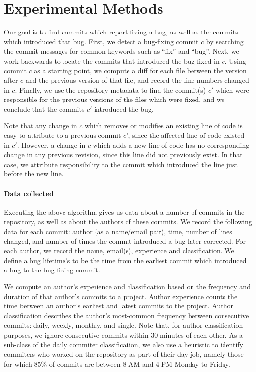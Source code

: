 \section{Experimental Methods}
\label{sec:method}
Our goal is to find commits which report fixing a bug, as well as the commits
which introduced that bug. First, we detect a bug-fixing commit $c$ by
searching the commit messages for common keywords such as ``fix'' and
``bug''. Next, we work backwards to locate the commits that introduced
the bug fixed in $c$. Using commit $c$ as a starting point, we compute
a diff for each file between the version after $c$ and the previous
version of that file, and record the line numbers changed in
$c$. Finally, we use the repository metadata to find the commit(s)
$c'$ which were responsible for the previous versions of the files
which were fixed, and we conclude that the commits $c'$ introduced the
bug.

Note that any change in $c$ which removes or modifies an existing line
of code is easy to attribute to a previous commit $c'$, since the
affected line of code existed in $c'$. However, a change in $c$ which
adds a new line of code has no corresponding change in any previous
revision, since this line did not previously exist. In that case, we
attribute responsibility to the commit which introduced the line just
before the new line.

\paragraph{Data collected}
Executing the above algorithm gives us data about a number of commits
in the repository, as well as about the authors of these commits.  We
record the following data for each commit: author (as a name/email
pair), time, number of lines changed, and number of times the commit
introduced a bug later corrected. For each author, we record the name,
email(s), experience and classification. We define a bug lifetime's to
be the time from the earliest commit which introduced a bug to the
bug-fixing commit.

We compute an author's experience and classification based on the
frequency and duration of that author's commits to a project. Author
experience counts the time between an author's earliest and latest
commits to the project. Author classification describes the author's
most-common frequency between consecutive commits: daily, weekly,
monthly, and single. Note that, for author classification purposes, we
ignore consecutive commits within 30 minutes of each other. As a
sub-class of the daily commiter classification, we also use a
heuristic to identify commiters who worked on the repository as part
of their day job, namely those for which 85\% of commits are between 8
AM and 4 PM Monday to Friday.

